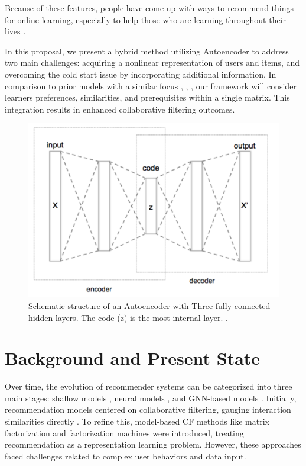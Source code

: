 Because of these features, people have come up with ways to recommend things for online learning, especially to help those who are learning throughout their lives \cite{zhang2021recommender}.

In this proposal, we present a hybrid method utilizing Autoencoder to address two main challenges: acquiring a nonlinear representation of users and items, and overcoming the cold start issue by incorporating additional information. In comparison to prior models with a similar focus \cite{sedhain2015autorec}, \cite{strub2015collaborative}, \cite{wu2016collaborative}, our framework will consider learners preferences, similarities, and prerequisites within a single matrix. This integration results in enhanced collaborative filtering outcomes.
\begin{figure}[h]
    \centering
    \includegraphics[width=0.6\linewidth]{figures/autoencoder.PNG} 
    \caption{Schematic structure of an Autoencoder with Three fully connected hidden layers. The code (z) is the most internal layer. \cite{darban2022ghrs}.}
    \label{fig:myimage}
\end{figure}

\newpage
\section{Background and Present State}
Over time, the evolution of recommender systems can be categorized into three main stages: shallow models \cite{koren2009matrix} \cite{rendle2010factorization} \cite{rendle2012bpr}, neural models \cite{cheng2016wide} \cite{guo2017deepfm} \cite{he2017neural}, and GNN-based models \cite{he2020lightgcn} \cite{wang2019neural} \cite{ying2018graph}. Initially, recommendation models centered on collaborative filtering, gauging interaction similarities directly . To refine this, model-based CF methods like matrix factorization \cite{koren2009matrix} and factorization machines \cite{rendle2010factorization} were introduced, treating recommendation as a representation learning problem. However, these approaches faced challenges related to complex user behaviors and data input.

